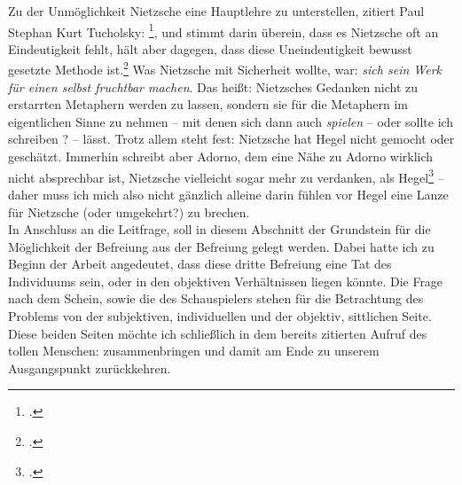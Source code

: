 \documentclass[12pt, a4paper, openany]{report}
\begin{document}
Zu der Unmöglichkeit Nietzsche eine Hauptlehre zu unterstellen, zitiert Paul Stephan Kurt Tucholsky: \footcite[][17]{stephan_nietzscheanismus_2019},
und stimmt darin überein, dass es Nietzsche oft an Eindeutigkeit fehlt, hält aber dagegen, dass diese Uneindeutigkeit bewusst gesetzte Methode ist.\footcite[Vgl.][18]{stephan_nietzscheanismus_2019}
Was Nietzsche mit Sicherheit wollte, war: \emph{sich sein Werk für einen selbst fruchtbar machen}. 
Das heißt: Nietzsches Gedanken nicht zu erstarrten Metaphern werden zu lassen, sondern sie für die Metaphern im eigentlichen Sinne zu nehmen -- mit denen sich dann auch \emph{spielen} -- oder sollte ich schreiben ? -- lässt.
Trotz allem steht fest: Nietzsche hat Hegel nicht gemocht oder geschätzt.
Immerhin schreibt aber Adorno, dem eine Nähe zu Adorno wirklich nicht absprechbar ist, Nietzsche vielleicht sogar mehr zu verdanken, als Hegel\footcite[Vgl.][255]{adorno_vorlesung_2010}
-- daher muss ich mich also nicht gänzlich alleine darin fühlen vor Hegel eine Lanze für Nietzsche (oder umgekehrt?) zu brechen.\\

In Anschluss an die Leitfrage, soll in diesem Abschnitt der Grundstein für die Möglichkeit der Befreiung aus der Befreiung gelegt werden.
Dabei hatte ich zu Beginn der Arbeit angedeutet, dass diese dritte Befreiung eine Tat des Individuums sein, oder in den objektiven Verhältnissen liegen könnte. 
Die Frage nach dem Schein, sowie die des Schauspielers stehen für die Betrachtung des Problems von der subjektiven, individuellen und der objektiv, sittlichen Seite. 
Diese beiden Seiten möchte ich schließlich in dem bereits zitierten Aufruf des tollen Menschen:  zusammenbringen und damit am Ende zu unserem Ausgangspunkt zurückkehren. 
\end{document}
